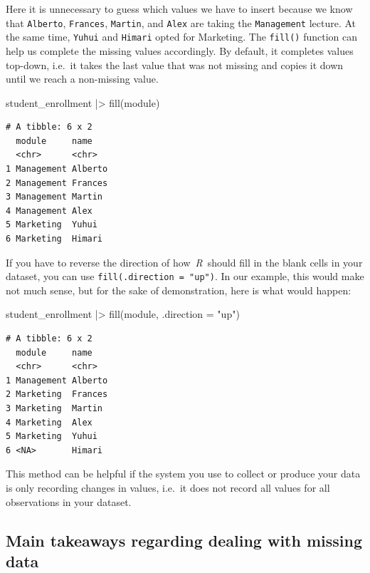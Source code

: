 \documentclass[
  letterpaper,
]{krantz}
\makeatletter
\newenvironment{Shaded}{\begin{snugshade}}{\end{snugshade}}
\newcommand{\AttributeTok}[1]{\textcolor[rgb]{0.40,0.45,0.13}{#1}}
\newcommand{\FunctionTok}[1]{\textcolor[rgb]{0.28,0.35,0.67}{#1}}
\newcommand{\NormalTok}[1]{\textcolor[rgb]{0.00,0.23,0.31}{#1}}
\newcommand{\SpecialCharTok}[1]{\textcolor[rgb]{0.37,0.37,0.37}{#1}}
\newcommand{\StringTok}[1]{\textcolor[rgb]{0.13,0.47,0.30}{#1}}
\newenvironment{kframe}{%
\medskip{}
\setlength{\fboxsep}{.8em}
 \def\at@end@of@kframe{}%
 \ifinner\ifhmode%
  \def\at@end@of@kframe{\end{minipage}}%
  \begin{minipage}{\columnwidth}%
 \fi\fi%
 \def\FrameCommand##1{\hskip\@totalleftmargin \hskip-\fboxsep
 \colorbox{shadecolor}{##1}\hskip-\fboxsep
     \hskip-\linewidth \hskip-\@totalleftmargin \hskip\columnwidth}%
 \MakeFramed {\advance\hsize-\width
   \@totalleftmargin\z@ \linewidth\hsize
   \@setminipage}}%
 {\par\unskip\endMakeFramed%
 \at@end@of@kframe}
\renewenvironment{Shaded}{\begin{kframe}}{\end{kframe}}
\makeatother
\begin{document}
Here it is unnecessary to guess which values we have to insert because
we know that \texttt{Alberto}, \texttt{Frances}, \texttt{Martin}, and
\texttt{Alex} are taking the \texttt{Management} lecture. At the same
time, \texttt{Yuhui} and \texttt{Himari} opted for Marketing. The
\texttt{fill()} function can help us complete the missing values
accordingly. By default, it completes values top-down, i.e.~it takes the
last value that was not missing and copies it down until we reach a
non-missing value.

\begin{Shaded}
\begin{Highlighting}[]
\NormalTok{student\_enrollment }\SpecialCharTok{|\textgreater{}} \FunctionTok{fill}\NormalTok{(module)}
\end{Highlighting}
\end{Shaded}

\begin{verbatim}
# A tibble: 6 x 2
  module     name   
  <chr>      <chr>  
1 Management Alberto
2 Management Frances
3 Management Martin 
4 Management Alex   
5 Marketing  Yuhui  
6 Marketing  Himari 
\end{verbatim}

If you have to reverse the direction of how~\emph{R}~should fill in the
blank cells in your dataset, you can use
\texttt{fill(.direction\ =\ "up")}. In our example, this would make not
much sense, but for the sake of demonstration, here is what would
happen:

\begin{Shaded}
\begin{Highlighting}[]
\NormalTok{student\_enrollment }\SpecialCharTok{|\textgreater{}} \FunctionTok{fill}\NormalTok{(module, }\AttributeTok{.direction =} \StringTok{"up"}\NormalTok{)}
\end{Highlighting}
\end{Shaded}

\begin{verbatim}
# A tibble: 6 x 2
  module     name   
  <chr>      <chr>  
1 Management Alberto
2 Marketing  Frances
3 Marketing  Martin 
4 Marketing  Alex   
5 Marketing  Yuhui  
6 <NA>       Himari 
\end{verbatim}

This method can be helpful if the system you use to collect or produce
your data is only recording changes in values, i.e.~it does not record
all values for all observations in your dataset.

\subsection{Main takeaways regarding dealing with missing
data}\label{sec-main-takeaways-missing-data}
\end{document}
